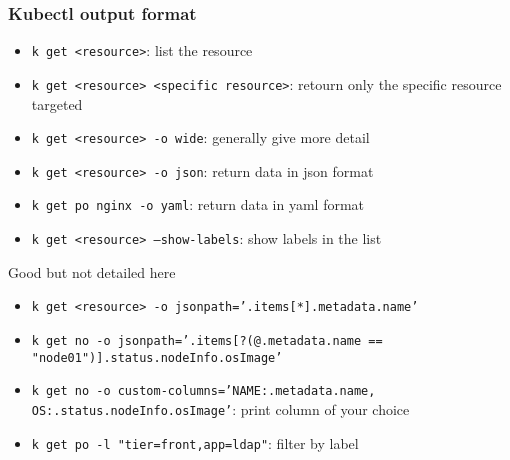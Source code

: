 \subsubsection{Kubectl output format}
\begin{frame}[fragile]{\subsubsecname}
  \begin{itemize}
    \item \texttt{k get <resource>}: list the resource
    \item \texttt{k get <resource> <specific resource>}: retourn only the specific resource targeted
    \item \texttt{k get <resource> -o wide}: generally give more detail
    \item \texttt{k get <resource> -o json}: return data in json format
    \item \texttt{k get po nginx -o yaml}: return data in yaml format
    \item \texttt{k get <resource> --show-labels}: show labels in the list
  \end{itemize}
  Good but not detailed here
  \begin{itemize}
    \item \texttt{k get <resource> -o jsonpath='{.items[*].metadata.name}'}
    \item \texttt{k get no -o jsonpath='{.items[?(@.metadata.name == "node01")].status.nodeInfo.osImage}'}
    \item \texttt{k get no -o custom-columns='NAME:.metadata.name, OS:.status.nodeInfo.osImage'}: print column of your choice
    \item \texttt{k get po -l "tier=front,app=ldap"}: filter by label
  \end{itemize}
\end{frame}
